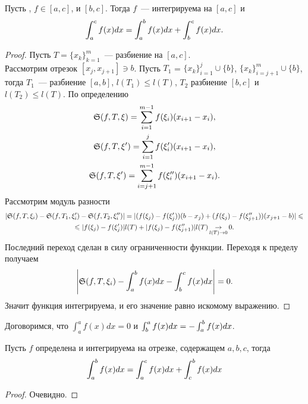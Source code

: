 \documentclass[../main.tex]{subfiles}
\begin{document}
\begin{proposition}
    Пусть \fabr, $f \in [a,c]$, \fintonab\space и $[b, c]$. Тогда $f$~--- интегрируема на $[a,c]$ и 
    \begin{gather*}
        \int_a^c f(x)dx =  \int_a^b f(x) dx + \int_b^c f(x) dx.
    \end{gather*}
\end{proposition}

\begin{proof}
    Пусть $T = \{x_k\}_{k=1}^m$~--- разбиение на $[a,c]$. \\ Рассмотрим отрезок $[x_j,x_{j+1}] \ni b$. Пусть $T_1$ = $\{x_k\}_{i=1}^j \cup \{b\}$, $\{x_k\}_{i=j+1}^m \cup \{b\}$, тогда $T_1$~--- разбиение $[a,b]$, $l(T_1) \leq l(T)$, $T_2$ разбиение $[b,c]$ и $l(T_2) \leq l(T)$. По определению
    \begin{gather*}
        \mathfrak{S}(f, T, \xi) = \sum_{i=1}^{m-1}f(\xi_i)(x_{i+1} - x_i), \\
        \mathfrak{S}(f, T, \xi') = \sum_{i=1}^{j}f(\xi'_i)(x_{i+1} - x_i), \\
        \mathfrak{S}(f, T, \xi') = \sum_{i=j+1}^{m-1}f(\xi''_i)(x_{i+1} - x_i).
    \end{gather*}
    Рассмотрим модуль разности
    \begin{multline*}
        |\mathfrak{S}(f, T, \xi_i) - \mathfrak{S}(f, T_1, \xi'_i) - \mathfrak{S}(f, T_2, \xi''_i)| = |(f(\xi_j) - f(\xi'_j))(b-x_j) + (f(\xi_j) - f(\xi''_{j+1}))(x_{j+1} -b)| \leqslant \\ \leqslant |f(\xi_j) - f(\xi'_j)|l(T) + |f(\xi_j) - f(\xi''_{j+1})|l(T) \operatorname*{\to}_{l(T) \to 0} 0.
    \end{multline*}
    Последний переход сделан в силу ограниченности функции. Переходя к пределу получаем
    \begin{gather*}
        \left| \mathfrak{S}(f, T, \xi_i) - \int_a^b f(x) dx - \int_b^c f(x) dx\right| = 0.
    \end{gather*}
    Значит функция интегрируема, и его значение равно искомому выражению.
\end{proof}

\begin{definition}
    Договоримся, что $\int_a^a f(x) dx = 0$ и $\int_b^a f(x) dx = -\int_a^b f(x) dx$.
\end{definition}

\begin{corollary}
    Пусть $f$ определена и интегрируема на отрезке, содержащем $a, b, c$, тогда
    \begin{gather*}
        \int_a^b f(x) dx = \int_a^c f(x) dx + \int_c^b f(x) dx
    \end{gather*}
\end{corollary}
\begin{proof}
    Очевидно.
\end{proof}
\end{document}
